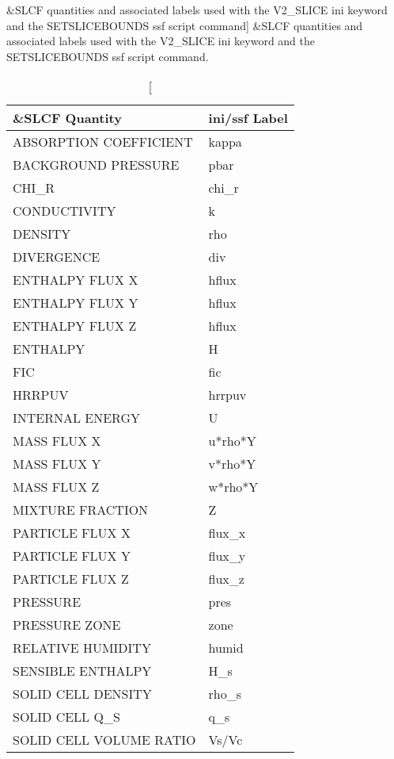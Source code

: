 \begin{table}[bph]
\begin{center}
\caption
[\&SLCF quantities and associated labels used with the V2\_SLICE ini keyword and the SETSLICEBOUNDS ssf script command]
{\&SLCF quantities and associated labels used with the V2\_SLICE ini keyword and the SETSLICEBOUNDS ssf script command.}
\vspace{0.1in}
\begin{tabular}{|l|l|}
\hline
\&SLCF Quantity & ini/ssf Label \\ \hline
 ABSORPTION COEFFICIENT  &   kappa \\ \hline
 BACKGROUND PRESSURE  &   pbar \\ \hline
 CHI\_R  &   chi\_r \\ \hline
 CONDUCTIVITY  &   k \\ \hline
 DENSITY  &   rho \\ \hline
 DIVERGENCE  &   div \\ \hline
 ENTHALPY FLUX X  &   hflux \\ \hline
 ENTHALPY FLUX Y  &   hflux \\ \hline
 ENTHALPY FLUX Z  &   hflux \\ \hline
 ENTHALPY  &   H \\ \hline
 FIC  &   fic \\ \hline
 HRRPUV  &   hrrpuv \\ \hline
 INTERNAL ENERGY  &   U \\ \hline
 MASS FLUX X  &   u*rho*Y \\ \hline
 MASS FLUX Y  &   v*rho*Y \\ \hline
 MASS FLUX Z  &   w*rho*Y \\ \hline
 MIXTURE FRACTION  &   Z \\ \hline
 PARTICLE FLUX X  &   flux\_x \\ \hline
 PARTICLE FLUX Y  &   flux\_y \\ \hline
 PARTICLE FLUX Z  &   flux\_z \\ \hline
 PRESSURE  &   pres \\ \hline
 PRESSURE ZONE  &   zone \\ \hline
 RELATIVE HUMIDITY  &   humid \\ \hline
 SENSIBLE ENTHALPY  &   H\_s \\ \hline
 SOLID CELL DENSITY  &   rho\_s \\ \hline
 SOLID CELL Q\_S  &   q\_s \\ \hline
 SOLID CELL VOLUME RATIO  &   Vs/Vc \\ \hline

\end{tabular}
\end{center}
\end{table}
